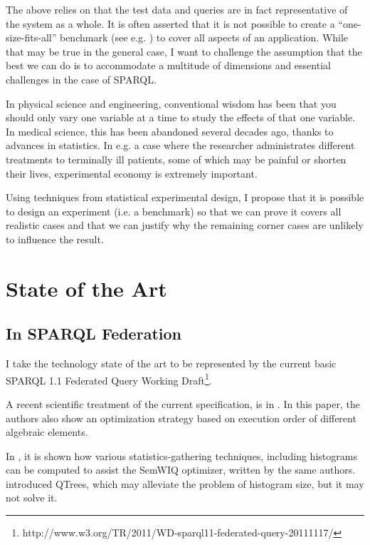 \documentclass{llncs}
\begin{document}
The above relies on that the test data and queries are in fact
representative of the system as a whole. It is often asserted that it
is not possible to create a ``one-size-fits-all'' benchmark (see
e.g. \cite{Schmidt:2011:FBS:2063016.2063054}) to cover all aspects of
an application. While that may be true in the general case, I want to
challenge the assumption that the best we can do is to accommodate a
multitude of dimensions and essential challenges in the case of
SPARQL.

In physical science and engineering, conventional wisdom has been that
you should only vary one variable at a time to study the effects of
that one variable. In medical science, this has been abandoned several
decades ago, thanks to advances in statistics. In e.g. a case where
the researcher administrates different treatments to terminally ill
patients, some of which may be painful or shorten their lives,
experimental economy is extremely important.

Using techniques from statistical experimental design, I propose
that it is possible to design an experiment (i.e. a benchmark) so that
we can prove it covers all realistic cases and that we can justify
why the remaining corner cases are unlikely to influence the result.


\section{State of the Art}

\subsection{In SPARQL Federation}

I take the technology state of the art to be represented by the
current basic SPARQL 1.1 Federated Query Working
Draft\footnote{http://www.w3.org/TR/2011/WD-sparql11-federated-query-20111117/}. 

A recent scientific treatment of the current specification, is in
\cite{springerlink:10.1007/978-3-642-21064-8-1}. In this paper, the
authors also show an optimization strategy based on execution order of
different algebraic elements. %

In \cite{5337556}, it is shown how various statistics-gathering
techniques, including histograms can be computed to assist the SemWIQ
optimizer, written by the same authors.
\cite{Harth:2010:DSO:1772690.1772733} introduced QTrees, which may
alleviate the problem of histogram size, but it may not solve it.
\end{document}
